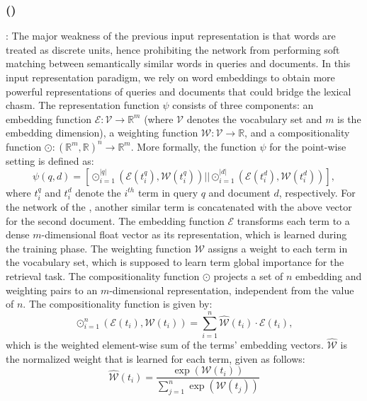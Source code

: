 \subsubsection{\label{sec:feedthree}\Feedthree (\fthree)}:
The major weakness of the previous input representation is that words are treated as discrete units, hence prohibiting the network from performing soft matching between semantically similar words in queries and documents. In this input representation paradigm, we rely on word embeddings to obtain more powerful representations of queries and documents that could bridge the lexical chasm. %
The representation function $\psi$ consists of three components: an embedding function $\mathcal{E}: \mathcal{V} \rightarrow \mathbb{R}^{m}$ (where $\mathcal{V}$ denotes the vocabulary set and $m$ is the embedding dimension), a weighting function $\mathcal{W}: \mathcal{V} \rightarrow \mathbb{R}$, and a compositionality function $\odot: (\mathbb{R}^{m}, \mathbb{R})^n \rightarrow \mathbb{R}^{m}$. More formally, the function $\psi$ for the point-wise setting is defined as:
\begin{equation}
\psi(q, d) = [\odot_{i=1}^{|q|}(\mathcal{E}(t_i^q), \mathcal{W}(t_i^q)) || \odot_{i=1}^{|d|} (\mathcal{E}(t_i^d), \mathcal{W}(t_i^d))],
\end{equation}
where $t_i^q$ and $t_i^d$ denote the $i^{th}$ term in query $q$ and document $d$, respectively. 
For the network of the \modelthree, another similar term is concatenated with the above vector for the second document. The embedding function $\mathcal{E}$ transforms each term to a dense $m$-dimensional float vector as its representation, which is learned during the training phase. The weighting function $\mathcal{W}$ assigns a weight to each term in the vocabulary set, which is supposed to learn term global importance for the retrieval task. The compositionality function $\odot$ projects a set of $n$ embedding and weighting pairs to an $m$-dimensional representation, independent from the value of $n$. The compositionality function is given by:
\begin{equation}
\odot_{i=1}^n(\mathcal{E}(t_i), \mathcal{W}(t_i)) = \sum_{i=1}^n \widehat{\mathcal{W}}(t_i)\cdot \mathcal{E}(t_i),
\end{equation}
which is the weighted element-wise sum of the terms' embedding vectors. $\widehat{\mathcal{W}}$ is the normalized weight that is learned for each term, given as follows:
\begin{equation}
\widehat{\mathcal{W}}(t_i) = \frac{\exp(\mathcal{W}(t_i))}{\sum_{j=1}^n{ \exp(\mathcal{W}(t_j))}}
\end{equation}

